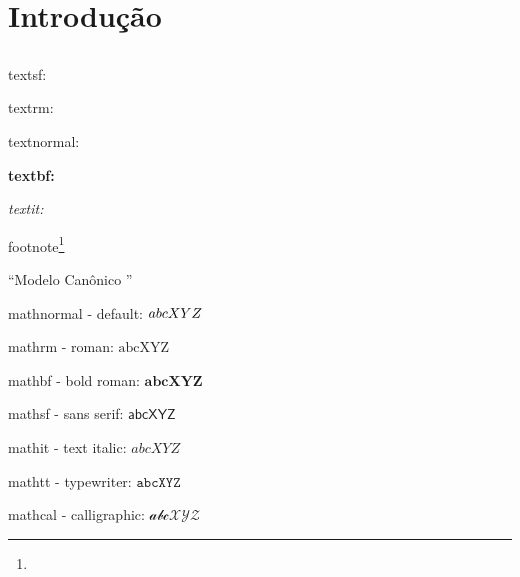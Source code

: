 


\chapter[Introdução]{Introdução \showfont}
\showfont
\section[Some encoding tests]{\showfont}
\subsection{\showfont}
\subsubsection{\showfont}

\textsf{textsf: \showfont} 

\textrm{textrm: \showfont}

\textnormal{textnormal: \showfont}

\textbf{textbf: \showfont} 

\textit{textit: \showfont}

footnote\footnote{\showfont}


``Modelo Canônico \showfont''


mathnormal -  default: $\mathnormal{abcXYZ}$

mathrm - roman: $\mathrm{abcXYZ}$

mathbf - bold roman: $\mathbf{abcXYZ}$

mathsf - sans serif: $\mathsf{abcXYZ}$

mathit - text italic: $\mathit{abcXYZ}$

mathtt -  typewriter: $\mathtt{abcXYZ}$

mathcal - calligraphic: $\mathcal{abcXYZ}$





